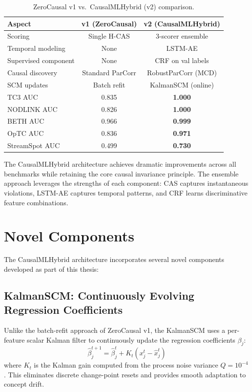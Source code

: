 \begin{table}[htbp]
\centering
\caption{ZeroCausal v1 vs.\ CausalMLHybrid (v2) comparison.}
\begin{tabular}{l|cc}
\hline
\textbf{Aspect} & \textbf{v1 (ZeroCausal)} & \textbf{v2 (CausalMLHybrid)} \\
\hline
Scoring & Single H-CAS & 3-scorer ensemble \\
Temporal modeling & None & LSTM-AE \\
Supervised component & None & CRF on val labels \\
Causal discovery & Standard ParCorr & RobustParCorr (MCD) \\
SCM updates & Batch refit & KalmanSCM (online) \\
\hline
TC3 AUC & 0.835 & \textbf{1.000} \\
NODLINK AUC & 0.826 & \textbf{1.000} \\
BETH AUC & 0.966 & \textbf{0.999} \\
OpTC AUC & 0.836 & \textbf{0.971} \\
StreamSpot AUC & 0.499 & \textbf{0.730} \\
\hline
\end{tabular}
\label{tab:v1_vs_v2}
\end{table}

The CausalMLHybrid architecture achieves dramatic improvements across all benchmarks while retaining the core causal invariance principle. The ensemble approach leverages the strengths of each component: CAS captures instantaneous violations, LSTM-AE captures temporal patterns, and CRF learns discriminative feature combinations.


\section{Novel Components}

The CausalMLHybrid architecture incorporates several novel components developed as part of this thesis:

\subsection{KalmanSCM: Continuously Evolving Regression Coefficients}

Unlike the batch-refit approach of ZeroCausal v1, the KalmanSCM uses a per-feature scalar Kalman filter to continuously update the regression coefficients $\beta_j$:
\begin{equation}
\hat{\beta}_j^{t+1} = \hat{\beta}_j^t + K_t (x_j^t - \hat{x}_j^t)
\end{equation}
where $K_t$ is the Kalman gain computed from the process noise variance $Q = 10^{-4}$. This eliminates discrete change-point resets and provides smooth adaptation to concept drift.

